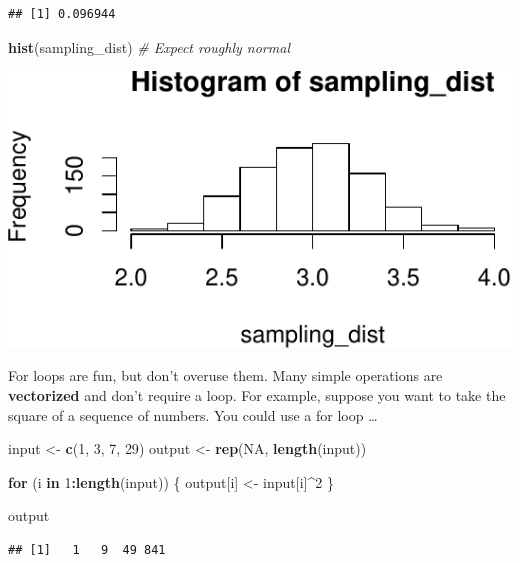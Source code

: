 \documentclass[12pt,oneside,openany]{book}
\newenvironment{Shaded}{\begin{snugshade}}{\end{snugshade}}
\newcommand{\KeywordTok}[1]{\textcolor[rgb]{0.13,0.29,0.53}{\textbf{#1}}}
\newcommand{\DecValTok}[1]{\textcolor[rgb]{0.00,0.00,0.81}{#1}}
\newcommand{\StringTok}[1]{\textcolor[rgb]{0.31,0.60,0.02}{#1}}
\newcommand{\CommentTok}[1]{\textcolor[rgb]{0.56,0.35,0.01}{\textit{#1}}}
\newcommand{\OtherTok}[1]{\textcolor[rgb]{0.56,0.35,0.01}{#1}}
\newcommand{\ControlFlowTok}[1]{\textcolor[rgb]{0.13,0.29,0.53}{\textbf{#1}}}
\newcommand{\OperatorTok}[1]{\textcolor[rgb]{0.81,0.36,0.00}{\textbf{#1}}}
\newcommand{\NormalTok}[1]{#1}
\begin{document}
\begin{verbatim}
## [1] 0.096944
\end{verbatim}

\begin{Shaded}
\begin{Highlighting}[]
\KeywordTok{hist}\NormalTok{(sampling_dist)  }\CommentTok{# Expect roughly normal}
\end{Highlighting}
\end{Shaded}

\includegraphics{pdaps_files/figure-latex/sampling-dist-results-1.pdf}

For loops are fun, but don't overuse them. Many simple operations are
\textbf{vectorized} and don't require a loop. For example, suppose you
want to take the square of a sequence of numbers. You could use a for
loop \ldots{}

\begin{Shaded}
\begin{Highlighting}[]
\NormalTok{input <-}\StringTok{ }\KeywordTok{c}\NormalTok{(}\DecValTok{1}\NormalTok{, }\DecValTok{3}\NormalTok{, }\DecValTok{7}\NormalTok{, }\DecValTok{29}\NormalTok{)}
\NormalTok{output <-}\StringTok{ }\KeywordTok{rep}\NormalTok{(}\OtherTok{NA}\NormalTok{, }\KeywordTok{length}\NormalTok{(input))}

\ControlFlowTok{for}\NormalTok{ (i }\ControlFlowTok{in} \DecValTok{1}\OperatorTok{:}\KeywordTok{length}\NormalTok{(input)) \{}
\NormalTok{  output[i] <-}\StringTok{ }\NormalTok{input[i]}\OperatorTok{^}\DecValTok{2}
\NormalTok{\}}

\NormalTok{output}
\end{Highlighting}
\end{Shaded}

\begin{verbatim}
## [1]   1   9  49 841
\end{verbatim}
\end{document}
